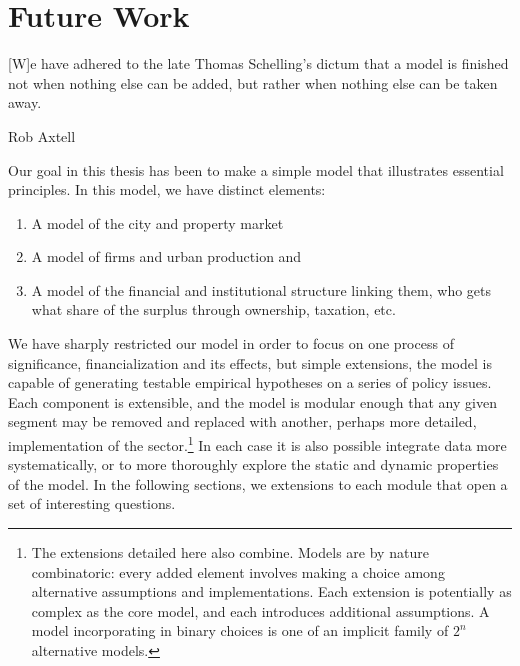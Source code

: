 \chapter[Future Work]{Future Work} \label{appendix-future-work}

\epigraph{[W]e have adhered to the late Thomas Schelling’s dictum that a model is finished not when nothing else can be added, but rather when nothing else can be taken away.}{Rob Axtell \cite{axtellDynamicsFirmsData2024}}

Our goal in this thesis has been to make a simple model that illustrates essential principles. %
In this model, we have distinct elements: 
\begin{enumerate}
    \item A model of the city and property market
    \item A model of firms and urban production and
    \item A model of the financial and institutional structure linking them, who gets what share of the surplus through ownership, taxation, etc.
\end{enumerate}

We have sharply restricted our model in order to focus on one process of significance, financialization and its effects, but simple extensions, the model is capable of generating testable empirical hypotheses on a series of policy issues. Each component is extensible, %
and the model is modular enough that any given segment may be removed and replaced with another, perhaps more detailed, implementation of the sector.\footnote{The extensions detailed here also combine. Models are by nature combinatoric: every added element involves making a choice among alternative assumptions and implementations. Each extension is potentially as complex as the core model, and each introduces additional assumptions.  A model incorporating in binary choices is one of an implicit family of $2^n$ alternative models.}
In each case it is also possible integrate data more systematically, or to more thoroughly explore the static and dynamic properties of the model. In the following sections, we extensions to each module that open a set of interesting questions. %


